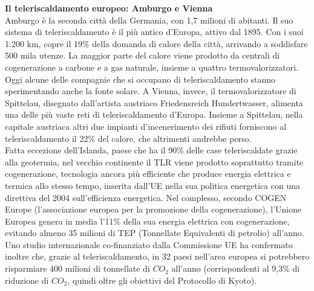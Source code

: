 \documentclass[laurea,oneside,11pt]{USiena_tesiLM}
\begin{document}
\noindent\textbf{Il teleriscaldamento europeo: Amburgo e Vienna}\\
\noindent Amburgo è la seconda città della Germania, con 1,7 milioni di abitanti. Il suo sistema di teleriscaldamento è il più antico d'Europa, attivo dal 1895. Con i suoi 1.200 km, copre il 19\% della domanda di calore della città, arrivando a soddisfare 500 mila utenze. La maggior parte del calore viene prodotto da centrali di cogenerazione a carbone e a gas naturale, insieme a quattro termovalorizzatori. Oggi alcune delle compagnie che si occupano di teleriscaldamento stanno sperimentando anche la fonte solare.
A Vienna, invece, il termovalorizzatore di Spittelau, disegnato dall’artista austriaco Friedensreich Hundertwasser, alimenta una delle più vaste reti di teleriscaldamento d'Europa. Insieme a Spittelau, nella capitale austriaca altri due impianti d'incenerimento dei rifiuti forniscono al teleriscaldamento il 22\% del calore, che altrimenti andrebbe perso.\\


Fatta eccezione dell’Islanda, paese che ha il 90\% delle case teleriscaldate grazie alla geotermia, nel vecchio continente il TLR viene prodotto soprattutto tramite cogenerazione, tecnologia ancora più efficiente che produce energia elettrica e termica allo stesso tempo, inserita dall'UE nella sua politica energetica con una direttiva del 2004 sull'efficienza energetica.
Nel complesso, secondo COGEN Europe (l'associazione europea per la promozione della cogenerazione), l'Unione Europea genera in media l'11\% della sua energia elettrica con cogenerazione, evitando almeno 35 milioni di TEP (Tonnellate Equivalenti di petrolio) all'anno. Uno studio internazionale co-finanziato dalla Commissione UE ha confermato inoltre che, grazie al teleriscaldamento, in 32 paesi nell'area europea si potrebbero risparmiare 400 milioni di tonnellate di $CO_2$ all'anno (corrispondenti al 9,3\% di riduzione di $CO_2$, quindi oltre gli obiettivi del Protocollo di Kyoto).\\
\end{document}
